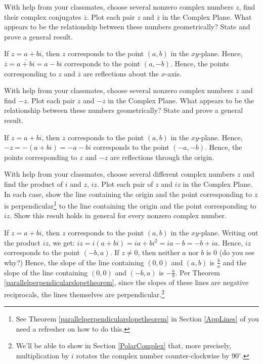 \documentclass{ximera}
\begin{document}
\begin{problem}\label{cmpgeoalgexfirst}
With help from your classmates, choose several nonzero complex numbers $z$, find their complex conjugates $\overline{z}$.  Plot each pair $z$ and $\overline{z}$ in the Complex Plane.  What appears to be the relationship between these numbers geometrically?  State and prove a general result. 

\begin{solution}
If $z = a+bi$, then $z$ corresponds to the point $(a,b)$ in the $xy$-plane.  Hence, $\overline{z} = \overline{a+bi} = a-bi$ corresponds to the point $(a,-b)$.  Hence, the points corresponding to $z$ and $\overline{z}$ are reflections about the $x$-axis.
\end{solution}
\end{problem}

\begin{problem}
With help from your classmates, choose several nonzero complex numbers $z$ and  find $-z$.  Plot each pair $z$ and $-z$ in the Complex Plane.  What appears to be the relationship between these numbers geometrically?  State and prove a general result.

\begin{solution}
If $z = a+bi$, then $z$ corresponds to the point $(a,b)$ in the $xy$-plane.  Hence, $-z =-(a+bi) = -a-bi$ corresponds to the point $(-a,-b)$.  Hence, the points corresponding to $z$ and $-z$ are reflections through the origin.
\end{solution}
\end{problem}

\begin{problem}
With help from your classmates, choose several different complex numbers $z$ and find the product of $i$ and $z$,  $iz$.  Plot each pair of $z$ and $iz$ in the Complex Plane.  In each case, show the line containing the origin and the point corresponding to $z$ is perpendicular\footnote{See Theorem \ref{parallelperpendicularslopetheorem} in Section \ref{AppLines} of you need a refresher on how to do this.} to the line containing the origin and the point corresponding to $iz$.  Show this result holds in general for every nonzero complex number.

\begin{solution}
If $z = a+bi$, then $z$ corresponds to the point $(a,b)$ in the $xy$-plane.  Writing out the product $iz$, we get: $iz =i(a+bi) = ia+bi^2 = ia - b = -b+ia$.  Hence, $iz$ corresponds to the point $(-b,a)$.  If $z \neq 0$, then neither $a$ nor $b$ is $0$ (do you see why?) Hence, the slope of the line containing $(0,0)$ and $(a,b)$ is $\frac{b}{a}$ and the slope of the line containing $(0,0)$ and $(-b,a)$ is $-\frac{a}{b}$.  Per Theorem \ref{parallelperpendicularslopetheorem}, since the slopes of these lines are negative reciprocals, the lines themselves are perpendicular.\footnote{We'll be able to show in Section \ref{PolarComplex}  that, more precisely, multiplication by $i$ rotates the complex number counter-clockwise by $90^{\circ}$.}
\end{solution}
\end{problem}
\end{document}
